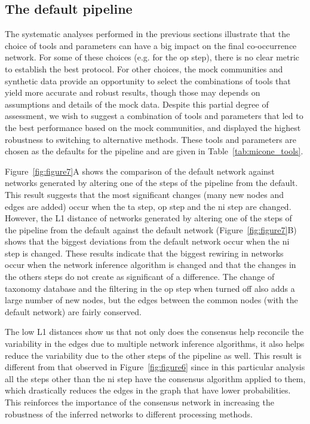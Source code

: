   \FloatBarrier

  \subsection*{The default pipeline}

  The systematic analyses performed in the previous sections illustrate that the choice of tools and parameters can have a big impact on the final co-occurrence network.
  For some of these choices (e.g. for the \ac{op} step), there is no clear metric to establish the best protocol.
  For other choices, the mock communities and synthetic data provide an opportunity to select the combinations of tools that yield more accurate and robust results, though those may depends on assumptions and details of the mock data.
  Despite this partial degree of assessment, we wish to suggest a combination of tools and parameters that led to the best performance based on the mock communities, and displayed the highest robustness to switching to alternative methods.
  These tools and parameters are chosen as the defaults for the pipeline and are given in Table~\ref{tab:micone_tools}.

  Figure~\ref{fig:figure7}A shows the comparison of the default network against networks generated by altering one of the steps of the pipeline from the default.
  This result suggests that the most significant changes (many new nodes and edges are added) occur when the \ac{ta} step, \ac{op} step and the \ac{ni} step are changed.
  However, the L1 distance of networks generated by altering one of the steps of the pipeline from the default against the default network (Figure~\ref{fig:figure7}B) shows that the biggest deviations from the default network occur when the \ac{ni} step is changed.
  These results indicate that the biggest rewiring in networks occur when the network inference algorithm is changed and that the changes in the others steps do not create as significant of a difference.
  The change of taxonomy database and the filtering in the \ac{op} step when turned off also adds a large number of new nodes, but the edges between the common nodes (with the default network) are fairly conserved.

  The low L1 distances show us that not only does the consensus help reconcile the variability in the edges due to multiple network inference algorithms, it also helps reduce the variability due to the other steps of the pipeline as well.
  This result is different from that observed in Figure~\ref{fig:figure6} since in this particular analysis all the steps other than the \ac{ni} step have the consensus algorithm applied to them, which drastically reduces the edges in the graph that have lower probabilities.
  This reinforces the importance of the consensus network in increasing the robustness of the inferred networks to different processing methods.


